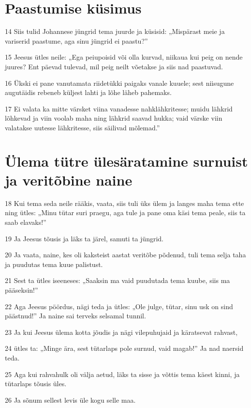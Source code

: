 \section*{Paastumise küsimus}

\par 14 Siis tulid Johannese jüngrid tema juurde ja küsisid: „Mispärast meie ja variserid paastume, aga sinu jüngrid ei paastu?”
\par 15 Jeesus ütles neile: „Ega peiupoisid või olla kurvad, niikaua kui peig on nende juures? Ent päevad tulevad, mil peig neilt võetakse ja siis nad paastuvad.
\par 16 Ükski ei pane vanutamata riidetükki paigaks vanale kuuele; sest niisugune augutäidis rebeneb küljest lahti ja lõhe läheb pahemaks.
\par 17 Ei valata ka mitte värsket viina vanadesse nahklähkritesse; muidu lähkrid lõhkevad ja viin voolab maha ning lähkrid saavad hukka; vaid värske viin valatakse uutesse lähkritesse, siis säilivad mõlemad.”

\section*{Ülema tütre ülesäratamine surnuist ja veritõbine naine}

\par 18 Kui tema seda neile rääkis, vaata, siis tuli üks ülem ja langes maha tema ette ning ütles: „Minu tütar suri praegu, aga tule ja pane oma käsi tema peale, siis ta saab elavaks!”
\par 19 Ja Jeesus tõusis ja läks ta järel, samuti ta jüngrid.
\par 20 Ja vaata, naine, kes oli kaksteist aastat veritõbe põdenud, tuli tema selja taha ja puudutas tema kuue palistust.
\par 21 Sest ta ütles iseeneses: „Saaksin ma vaid puudutada tema kuube, siis ma pääseksin!”
\par 22 Aga Jeesus pöördus, nägi teda ja ütles: „Ole julge, tütar, sinu usk on sind päästnud!” Ja naine sai terveks selsamal tunnil.
\par 23 Ja kui Jeesus ülema kotta jõudis ja nägi vilepuhujaid ja käratsevat rahvast,
\par 24 ütles ta: „Minge ära, sest tütarlaps pole surnud, vaid magab!” Ja nad naersid teda.
\par 25 Aga kui rahvahulk oli välja aetud, läks ta sisse ja võttis tema käest kinni, ja tütarlaps tõusis üles.
\par 26 Ja sõnum sellest levis üle kogu selle maa.

